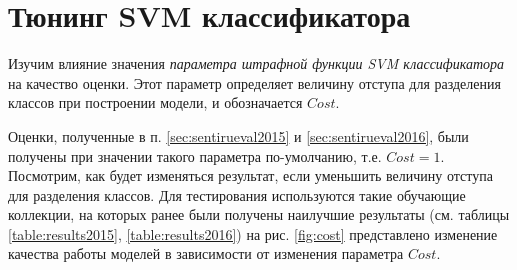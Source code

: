 \section{Тюнинг SVM классификатора}
Изучим влияние значения {\it параметра штрафной функции SVM классификатора} на
качество оценки.
Этот параметр определяет величину отступа для разделения классов при построении
модели, и обозначается $Cost$.

Оценки, полученные в п. \ref{sec:sentirueval2015} и \ref{sec:sentirueval2016},
были получены при значении такого параметра по-умолчанию, т.е. $Cost=1$.
Посмотрим, как будет изменяться результат, если уменьшить величину отступа для
разделения классов.
Для тестирования используются такие обучающие коллекции, на которых ранее были
получены наилучшие результаты (см. таблицы \ref{table:results2015}, \ref{table:results2016})
на рис. \ref{fig:cost} представлено изменение качества работы моделей в
зависимости от изменения параметра $Cost$.

